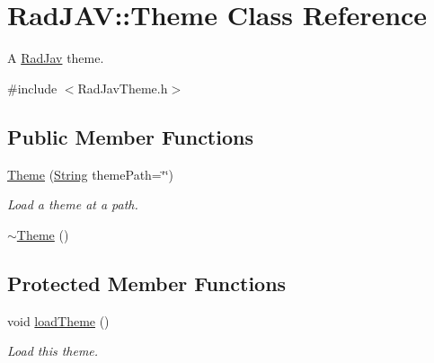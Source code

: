 \hypertarget{class_rad_j_a_v_1_1_theme}{}\section{Rad\+J\+AV\+:\+:Theme Class Reference}
\label{class_rad_j_a_v_1_1_theme}


A \mbox{\hyperlink{class_rad_j_a_v_1_1_rad_jav}{Rad\+Jav}} theme.  




{\ttfamily \#include $<$Rad\+Jav\+Theme.\+h$>$}

\subsection*{Public Member Functions}
\begin{DoxyCompactItemize}
\item 
\mbox{\hyperlink{class_rad_j_a_v_1_1_theme_a5b1649881314acd83096de433758be41}{Theme}} (\mbox{\hyperlink{class_rad_j_a_v_1_1_string}{String}} theme\+Path=\char`\"{}\char`\"{})
\begin{DoxyCompactList}\small\item\em Load a theme at a path. \end{DoxyCompactList}\item 
\mbox{\hyperlink{class_rad_j_a_v_1_1_theme_a7927c6251acff2d4bd162bb19b7fa637}{$\sim$\+Theme}} ()
\end{DoxyCompactItemize}
\subsection*{Protected Member Functions}
\begin{DoxyCompactItemize}
\item 
void \mbox{\hyperlink{class_rad_j_a_v_1_1_theme_ad94d2f3048ae0289215c18126bc2187e}{load\+Theme}} ()
\begin{DoxyCompactList}\small\item\em Load this theme. \end{DoxyCompactList}\end{DoxyCompactItemize}
